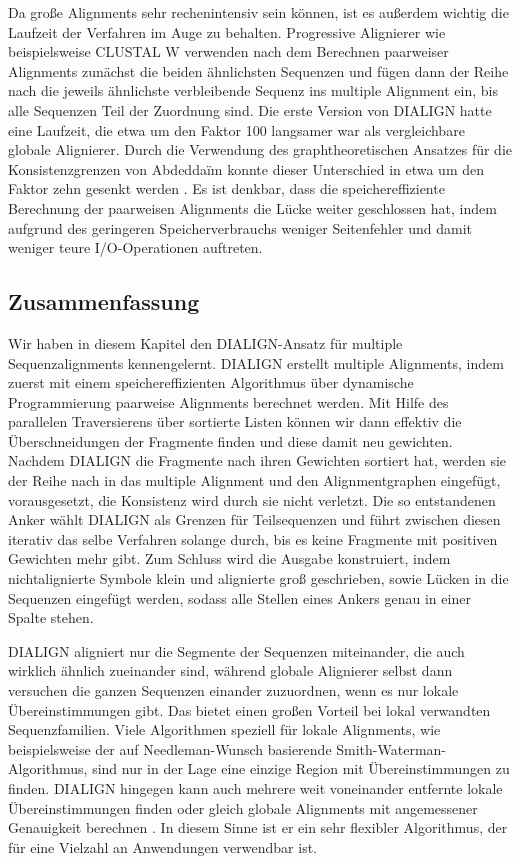 Da große Alignments sehr rechenintensiv sein können, ist es außerdem wichtig die Laufzeit der Verfahren im Auge zu behalten. Progressive Alignierer wie beispielsweise CLUSTAL W verwenden nach dem Berechnen paarweiser Alignments zunächst die beiden ähnlichsten Sequenzen und fügen dann der Reihe nach die jeweils ähnlichste verbleibende Sequenz ins multiple Alignment ein, bis alle Sequenzen Teil der Zuordnung sind.  Die erste Version von DIALIGN hatte eine Laufzeit, die etwa um den Faktor 100 langsamer war als vergleichbare globale Alignierer. Durch die Verwendung des graphtheoretischen Ansatzes für die Konsistenzgrenzen von Abdedda\"im konnte dieser Unterschied in etwa um den Faktor zehn gesenkt werden \cite{am00}. Es ist denkbar, dass die speichereffiziente Berechnung der paarweisen Alignments die Lücke weiter geschlossen hat, indem aufgrund des geringeren Speicherverbrauchs weniger Seitenfehler und damit weniger teure I/O-Operationen auftreten.


\subsection{Zusammenfassung}

Wir haben in diesem Kapitel den DIALIGN-Ansatz für multiple Sequenzalignments kennengelernt. DIALIGN erstellt multiple Alignments, indem zuerst mit einem speichereffizienten Algorithmus über dynamische Programmierung paarweise Alignments berechnet werden. Mit Hilfe des parallelen Traversierens über sortierte Listen können wir dann effektiv die Überschneidungen der Fragmente finden und diese damit neu gewichten. Nachdem DIALIGN die Fragmente nach ihren Gewichten sortiert hat, werden sie der Reihe nach in das multiple Alignment und den Alignmentgraphen eingefügt, vorausgesetzt, die Konsistenz wird durch sie nicht verletzt. Die so entstandenen Anker wählt DIALIGN als Grenzen für Teilsequenzen und führt zwischen diesen iterativ das selbe Verfahren solange durch, bis es keine Fragmente mit positiven Gewichten mehr gibt. Zum Schluss wird die Ausgabe konstruiert, indem nichtalignierte Symbole klein und alignierte groß geschrieben, sowie Lücken in die Sequenzen eingefügt werden, sodass alle Stellen eines Ankers genau in einer Spalte stehen. 

DIALIGN aligniert nur die Segmente der Sequenzen miteinander, die auch wirklich ähnlich zueinander sind, während globale Alignierer selbst dann versuchen die ganzen Sequenzen einander zuzuordnen, wenn es nur lokale Übereinstimmungen gibt. Das bietet einen großen Vorteil bei lokal verwandten Sequenzfamilien. Viele Algorithmen speziell für lokale Alignments, wie beispielsweise der auf Needleman-Wunsch basierende Smith-Waterman-Algorithmus, sind nur in der Lage eine einzige Region mit Übereinstimmungen zu finden. DIALIGN hingegen kann auch mehrere weit voneinander entfernte lokale Übereinstimmungen finden oder gleich globale Alignments mit angemessener Genauigkeit berechnen \cite{mdw96}. In diesem Sinne ist er ein sehr flexibler Algorithmus, der für eine Vielzahl an Anwendungen verwendbar ist. 

